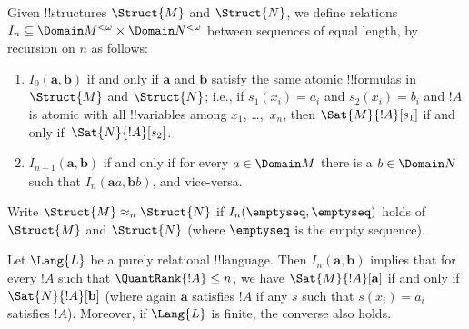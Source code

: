 \documentclass[../../../include/open-logic-section]{subfiles}
\begin{document}
\begin{defn}
  Given !!{structure}s $\Struct{M}$ and $\Struct{N}$, we define
  relations $I_n \subseteq \Domain M^{<\omega} \times \Domain N^{<\omega}$ between
  sequences of equal length, by recursion on $n$ as follows:
   \begin{enumerate}
   \item $I_0(\mathbf{a},\mathbf{b})$ if and only if $\mathbf{a}$ and
     $\mathbf{b}$ satisfy the same atomic !!{formula}s in  $\Struct{M}$
     and  $\Struct{N}$; i.e., if $s_1(x_i) = a_i$ and $s_2(x_i) =
     b_i$ and $!A$ is atomic with all !!{variable}s among
     $x_1$, \dots,~$x_n$, then $\Sat{M}{!A}[s_1]$ if and
     only if~$\Sat{N}{!A}[s_2]$.
   \item $I_{n+1} (\mathbf{a},\mathbf{b})$ if and only if for every
     $a\in \Domain M$ there is a $b\in \Domain N$ such that $I_n
     (\mathbf{a}a,\mathbf{b}b)$, and vice-versa.
   \end{enumerate}
\end{defn}


\begin{defn}
  Write $\Struct{M} \approx_n \Struct{N}$ if
  $I_n(\emptyseq,\emptyseq)$ holds of $\Struct{M}$ and
  $\Struct{N}$ (where $\emptyseq$ is the empty sequence).
\end{defn}

\begin{thm}
  Let $\Lang{L}$ be a purely relational !!{language}. Then $I_n
  (\mathbf{a},\mathbf{b})$ implies that for every $!A$ such that
  $\QuantRank{!A} \le n$, we have $\Sat{M}{!A}[\mathbf{a}]$ if and
  only if $\Sat{N}{!A}[\mathbf{b}]$ (where again $\mathbf{a}$
  satisfies $!A$ if any $s$ such that $s(x_i) = a_i$ satisfies
  $!A$). Moreover, if $\Lang{L}$ is finite, the converse also holds.
\end{thm}
\end{document}
